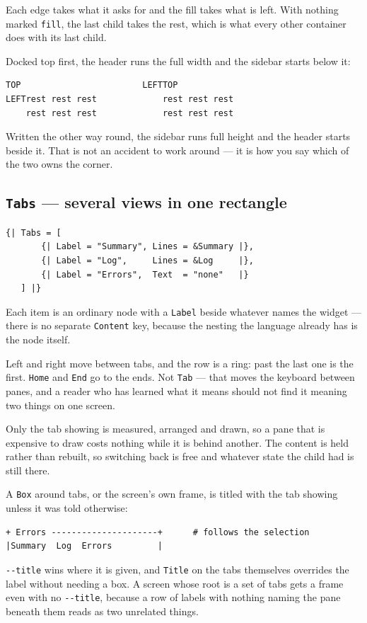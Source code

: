 \documentclass[11pt,a4paper,twoside,openany]{book}
\newcommand{\code}[1]{\texttt{\small #1}}
\begin{document}
Each edge takes what it asks for and the fill takes what is left. With nothing marked
\code{fill}, the last child takes the rest, which is what every other container does
with its last child.

\begin{notebox}
Docked top first, the header runs the full width and the sidebar starts below it:

\begin{verbatim}
TOP                        LEFTTOP
LEFTrest rest rest             rest rest rest
    rest rest rest             rest rest rest
\end{verbatim}

\noindent Written the other way round, the sidebar runs full height and the header
starts beside it. That is not an accident to work around --- it is how you say which
of the two owns the corner.
\end{notebox}

\subsection{\texttt{Tabs} --- several views in one rectangle}

\begin{lstlisting}
{| Tabs = [
       {| Label = "Summary", Lines = &Summary |},
       {| Label = "Log",     Lines = &Log     |},
       {| Label = "Errors",  Text  = "none"   |}
   ] |}
\end{lstlisting}

Each item is an ordinary node with a \code{Label} beside whatever names the widget
--- there is no separate \code{Content} key, because the nesting the language
already has is the node itself.

Left and right move between tabs, and the row is a ring: past the last one is the
first. \code{Home} and \code{End} go to the ends. Not \code{Tab} --- that moves the
keyboard between panes, and a reader who has learned what it means should not find
it meaning two things on one screen.

Only the tab showing is measured, arranged and drawn, so a pane that is expensive to
draw costs nothing while it is behind another. The content is held rather than
rebuilt, so switching back is free and whatever state the child had is still there.

\begin{notebox}
A \code{Box} around tabs, or the screen's own frame, is titled with the tab
showing unless it was told otherwise:

\begin{verbatim}
+ Errors ---------------------+      # follows the selection
|Summary  Log  Errors         |
\end{verbatim}

\noindent \code{-{}-title} wins where it is given, and \code{Title} on the tabs
themselves overrides the label without needing a box. A screen whose root is a set of
tabs gets a frame even with no \code{-{}-title}, because a row of labels with nothing
naming the pane beneath them reads as two unrelated things.
\end{notebox}
\end{document}
